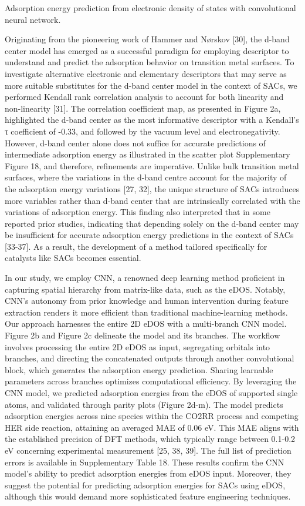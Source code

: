 Adsorption energy prediction from electronic density of states with convolutional neural network.

Originating from the pioneering work of Hammer and Nørskov [30], the d-band center model has emerged as a successful paradigm for employing descriptor to understand and predict the adsorption behavior on transition metal surfaces. To investigate alternative electronic and elementary descriptors that may serve as more suitable substitutes for the d-band center model in the context of SACs, we performed Kendall rank correlation analysis to account for both linearity and non-linearity [31]. The correlation coefficient map, as presented in Figure 2a, highlighted the d-band center as the most informative descriptor with a Kendall's τ coefficient of -0.33, and followed by the vacuum level and electronegativity. However, d-band center alone does not suffice for accurate predictions of intermediate adsorption energy as illustrated in the scatter plot Supplementary Figure 18, and therefore, refinements are imperative. Unlike bulk transition metal surfaces, where the variations in the d-band centre account for the majority of the adsorption energy variations [27, 32], the unique structure of SACs introduces more variables rather than d-band center that are intrinsically correlated with the variations of adsorption energy. This finding also interpreted that in some reported prior studies, indicating that depending solely on the d-band center may be insufficient for accurate adsorption energy predictions in the context of SACs [33-37]. As a result, the development of a method tailored specifically for catalysts like SACs becomes essential.

In our study, we employ CNN, a renowned deep learning method proficient in capturing spatial hierarchy from matrix-like data, such as the eDOS. Notably, CNN's autonomy from prior knowledge and human intervention during feature extraction renders it more efficient than traditional machine-learning methods. Our approach harnesses the entire 2D eDOS with a multi-branch CNN model. Figure 2b and Figure 2c delineate the model and its branches. The workflow involves processing the entire 2D eDOS as input, segregating orbitals into branches, and directing the concatenated outputs through another convolutional block, which generates the adsorption energy prediction. Sharing learnable parameters across branches optimizes computational efficiency. By leveraging the CNN model, we predicted adsorption energies from the eDOS of supported single atoms, and validated through parity plots (Figure 2d-m). The model predicts adsorption energies across nine species within the CO2RR process and competing HER side reaction, attaining an averaged MAE of 0.06 eV. This MAE aligns with the established precision of DFT methods, which typically range between 0.1-0.2 eV concerning experimental measurement [25, 38, 39]. The full list of prediction errors is available in Supplementary Table 18. These results confirm the CNN model's ability to predict adsorption energies from eDOS input. Moreover, they suggest the potential for predicting adsorption energies for SACs using eDOS, although this would demand more sophisticated feature engineering techniques.

